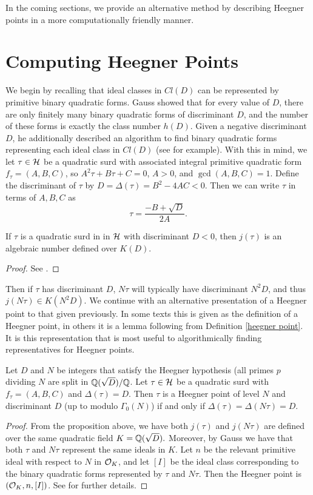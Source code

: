 In the coming sections, we provide an alternative method by describing Heegner points in a more computationally friendly manner.


\section{Computing Heegner Points}
We begin by recalling that ideal classes in $Cl(D)$ can be represented by primitive binary quadratic forms. Gauss showed that for every value of $D$, there are only finitely many binary quadratic forms of discriminant $D$, and the number of these forms is exactly the class number $h(D)$. Given a negative discriminant $D$, he additionally described an algorithm to find binary quadratic forms representing each ideal class in $Cl(D)$ (see \cite[Chapter 5]{Cohen} for example). With this in mind, we let $\tau \in \mathcal{H}$ be a quadratic surd with associated integral primitive quadratic form $f_\tau = (A,B,C)$, so $A^2\tau + B\tau + C = 0$, $A > 0$, and $\gcd(A,B,C) = 1$. Define the discriminant of $\tau$ by $D = \Delta(\tau) = B^2 - 4AC < 0$. Then we can write $\tau$ in terms of $A,B,C$ as
$$\tau = \frac{-B + \sqrt{D}}{2A}.$$
\begin{prop}
If $\tau$ is a quadratic surd in in $\mathcal{H}$ with discriminant $D < 0$, then $j(\tau)$ is an algebraic number defined over $K(D)$.
\end{prop}
\begin{proof}
See \cite[Page 30]{Darmon2}.
\end{proof}
Then if $\tau$ has discriminant $D$, $N\tau$ will typically have discriminant $N^2D$, and thus $j(N\tau) \in K(N^2D)$. We continue with an alternative presentation of a Heegner point to that given previously. In some texts this is given as the definition of a Heegner point, in others it is a lemma following from Definition \ref{heegner point}. It is this representation that is most useful to algorithmically finding representatives for Heegner points.
\begin{lem}
Let $D$ and $N$ be integers that satisfy the Heegner hypothesis (all primes $p$ dividing $N$ are split in $\mathbb{Q}(\sqrt{D})/\mathbb{Q}$. Let $\tau \in \mathcal{H}$ be a quadratic surd with $f_\tau = (A,B,C)$ and $\Delta(\tau) = D$. Then $\tau$ is a Heegner point of level $N$ and discriminant $D$ (up to modulo $\Gamma_0(N)$) if and only if $\Delta(\tau) = \Delta(N\tau) = D$. 
\end{lem}
\begin{proof}
From the proposition above, we have both $j(\tau)$ and $j(N\tau)$ are defined over the same quadratic field $K = \mathbb{Q}(\sqrt{D}).$ Moreover, by Gauss we have that both $\tau$ and $N\tau$ represent the same ideals in $K$. Let $n$ be the relevant primitive ideal with respect to $N$ in $\mathcal{O}_K$, and let $[I]$ be the ideal class corresponding to the binary quadratic forms represented by $\tau$ and $N\tau$. Then the Heegner point is $(\mathcal{O}_K,n,[I])$. See \cite[Chapter 3]{MR1123075} for further details.
\end{proof}
